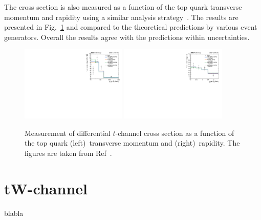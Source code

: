 \documentclass[12pt]{article}
\begin{document}
The cross section is also measured as a function of the top quark transverse momentum and rapidity using a similar analysis strategy~\cite{tchannel-diff}. The results are presented in Fig.~\ref{fig:tchan-diff} and compared to the theoretical predictions by various event generators. Overall the results agree with the predictions within uncertainties.

\begin{figure}[!htb]
\begin{center}
\includegraphics[width=0.45\textwidth]{unfolded_top_pt.pdf}\hspace{0.02\textwidth}
\includegraphics[width=0.45\textwidth]{unfolded_top_y.pdf}
\caption{\label{fig:tchan-diff}Measurement of differential $t$-channel cross section as a function of the top quark (left)~transverse momentum and (right)~rapidity. The figures are taken from Ref~\cite{tchannel-diff}.}
\end{center}
\end{figure}


\section{tW-channel}

blabla
\end{document}
